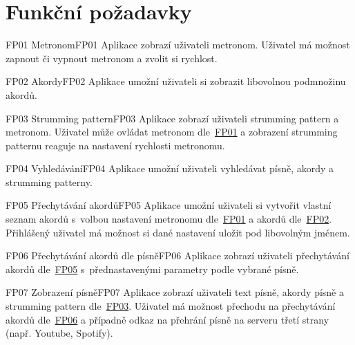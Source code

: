 \section{Funkční požadavky}
\label{sc:functional_req}

\begin{requirment}{FP01 Metronom}{FP01}
    Aplikace zobrazí uživateli metronom. Uživatel má možnost zapnout či vypnout metronom a zvolit si rychlost.
\end{requirment}

\begin{requirment}{FP02 Akordy}{FP02}
    Aplikace umožní uživateli si zobrazit libovolnou podmnožinu akordů.
\end{requirment}

\begin{requirment}{FP03 Strumming pattern}{FP03}
    Aplikace zobrazí uživateli strumming pattern a metronom. Uživatel může ovládat metronom dle~\hyperref[FP01]{FP01} a zobrazení strumming patternu reaguje na nastavení rychlosti metronomu.
\end{requirment}

\begin{requirment}{FP04 Vyhledávání}{FP04}
    Aplikace umožní uživateli vyhledávat písně, akordy a strumming patterny.
\end{requirment}

\begin{requirment}{FP05 Přechytávání akordů}{FP05}
    Aplikace umožní uživateli si vytvořit vlastní seznam akordů s~volbou nastavení metronomu dle~\hyperref[FP01]{FP01} a akordů dle~\hyperref[FP02]{FP02}.
    Přihlášený uživatel má možnost si dané nastavení uložit pod libovolným jménem.
\end{requirment}

\begin{requirment}{FP06 Přechytávání akordů dle písně}{FP06}
    Aplikace zobrazí uživateli přechytávání akordů dle~\hyperref[FP05]{FP05} s~přednastavenými parametry podle vybrané písně.
\end{requirment}

\begin{requirment}{FP07 Zobrazení písně}{FP07}
    Aplikace zobrazí uživateli text písně, akordy písně a strumming pattern dle~\hyperref[FP03]{FP03}. Uživatel má možnost přechodu na přechytávání akordů dle~\hyperref[FP06]{FP06} a případně odkaz na přehrání písně na serveru třetí strany (např. Youtube, Spotify).
\end{requirment}

